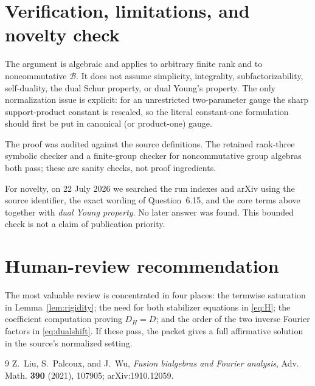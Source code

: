 \documentclass[11pt]{amsart}
\newcommand{\B}{\mathcal B}
\begin{document}
\section*{Verification, limitations, and novelty check}

The argument is algebraic and applies to arbitrary finite rank and to
noncommutative $\B$.  It does not assume simplicity, integrality,
subfactorizability, self-duality, the dual Schur property, or dual Young's
property.  The only normalization issue is explicit: for an unrestricted
two-parameter gauge the sharp support-product constant is rescaled, so the
literal constant-one formulation should first be put in canonical (or
product-one) gauge.

The proof was audited against the source definitions.  The retained
rank-three symbolic checker and a finite-group checker for noncommutative
group algebras both pass; these are sanity checks, not proof ingredients.

For novelty, on 22 July 2026 we searched the run indexes and arXiv using the
source identifier, the exact wording of Question~6.15, and the core terms
above together with \emph{dual Young property}.  No later answer was found.
This bounded check is not a claim of publication priority.

\section*{Human-review recommendation}

The most valuable review is concentrated in four places: the termwise
saturation in Lemma~\ref{lem:rigidity}; the need for both stabilizer equations
in \eqref{eq:H}; the coefficient computation proving $D_H=D$; and the order
of the two inverse Fourier factors in \eqref{eq:dualshift}.  If these pass,
the packet gives a full affirmative solution in the source's normalized
setting.

\begin{thebibliography}{9}
Z.~Liu, S.~Palcoux, and J.~Wu,
\emph{Fusion bialgebras and Fourier analysis},
Adv. Math. \textbf{390} (2021), 107905;
arXiv:1910.12059.
\end{thebibliography}
\end{document}
